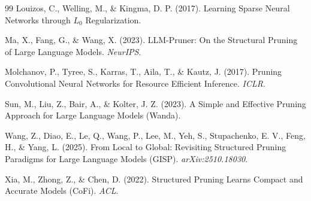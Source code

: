 \documentclass[11pt]{article}
\begin{document}
\begin{thebibliography}{99}
 Louizos, C., Welling, M., \& Kingma, D. P. (2017). Learning Sparse Neural Networks through $L_0$ Regularization.

 Ma, X., Fang, G., \& Wang, X. (2023). LLM-Pruner: On the Structural Pruning of Large Language Models. \textit{NeurIPS}.

 Molchanov, P., Tyree, S., Karras, T., Aila, T., \& Kautz, J. (2017). Pruning Convolutional Neural Networks for Resource Efficient Inference. \textit{ICLR}.

 Sun, M., Liu, Z., Bair, A., \& Kolter, J. Z. (2023). A Simple and Effective Pruning Approach for Large Language Models (Wanda).

 Wang, Z., Diao, E., Le, Q., Wang, P., Lee, M., Yeh, S., Stupachenko, E. V., Feng, H., \& Yang, L. (2025). From Local to Global: Revisiting Structured Pruning Paradigms for Large Language Models (GISP). \textit{arXiv:2510.18030}.

 Xia, M., Zhong, Z., \& Chen, D. (2022). Structured Pruning Learns Compact and Accurate Models (CoFi). \textit{ACL}.

\end{thebibliography}
\end{document}
